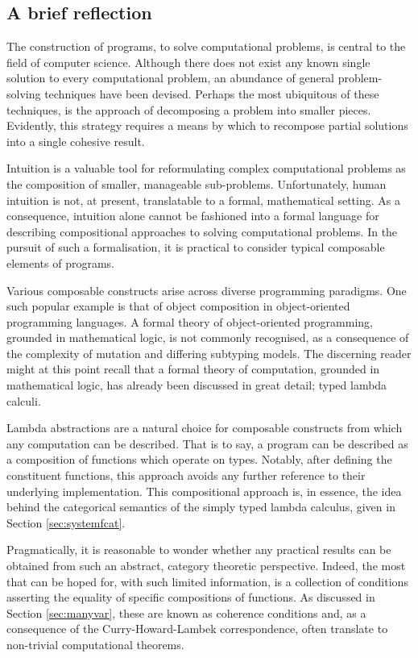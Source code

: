 \documentclass[../../Reflection.tex]{subfiles}
\begin{document}
\subsection{A brief reflection}
The construction of programs, to solve computational problems, is central to the field of computer science. Although there does not exist any known single solution to every computational problem, an abundance of general problem-solving techniques have been devised. Perhaps the most ubiquitous of these techniques, is the approach of decomposing a problem into smaller pieces. Evidently, this strategy requires a means by which to recompose partial solutions into a single cohesive result.
\par
Intuition is a valuable tool for reformulating complex computational problems as the composition of smaller, manageable sub-problems. Unfortunately, human intuition is not, at present, translatable to a formal, mathematical setting. As a consequence, intuition alone cannot be fashioned into a formal language for describing compositional approaches to solving computational problems. In the pursuit of such a formalisation, it is practical to consider typical composable elements of programs.
\par
Various composable constructs arise across diverse programming paradigms. One such popular example is that of object composition in object-oriented programming languages. A formal theory of object-oriented programming, grounded in mathematical logic, is not commonly recognised, as a consequence of the complexity of mutation and differing subtyping models. The discerning reader might at this point recall that a formal theory of computation, grounded in mathematical logic, has already been discussed in great detail; typed lambda calculi.
\par
Lambda abstractions are a natural choice for composable constructs from which any computation can be described. That is to say, a program can be described as a composition of functions which operate on types. Notably, after defining the constituent functions, this approach avoids any further reference to their underlying implementation. This compositional approach is, in essence, the idea behind the categorical semantics of the simply typed lambda calculus, given in  Section \ref{sec:systemfcat}.
\par
Pragmatically, it is reasonable to wonder whether any practical results can be obtained from such an abstract, category theoretic perspective. Indeed, the most that can be hoped for, with such limited information, is a collection of conditions asserting the equality of specific compositions of functions. As discussed in Section \ref{sec:manyvar}, these are known as coherence conditions and, as a consequence of the Curry-Howard-Lambek correspondence, often translate to non-trivial computational theorems. 
\end{document}

